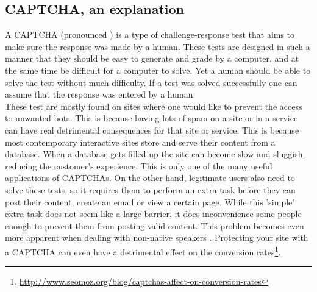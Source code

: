 \documentclass[pdftex,a4paper,12pt,twoside]{report}
\theoremstyle{plain} \newtheorem{theorem}{Theorem} \newtheorem{proposition}{Proposition} \newtheorem{lemma}{Lemma} \newtheorem*{corollary}{Corollary}
\theoremstyle{definition} \newtheorem{definition}{Definition} \newtheorem{conjecture}{Conjecture} \newtheorem*{example}{Example} \newtheorem{algorithm}{Algorithm}
\theoremstyle{remark} \newtheorem*{remark}{Remark} \newtheorem*{note}{Note} \newtheorem{case}{Case}
\begin{document}
\subsection{CAPTCHA, an explanation}
A CAPTCHA (pronounced ) is a type of challenge-response test that aims to make sure the response was made by a human. These tests are designed in such a manner that they should be easy to generate and grade by a computer, and at the same time be difficult for a computer to solve. Yet a human should be able to solve the test without much difficulty. If a test was solved successfully one can assume that the response was entered by a human.\\These test are mostly found on sites where one would like to prevent the access to unwanted bots. This is because having lots of spam on a site or in a service can have real detrimental consequences for that site or service. This is because most contemporary interactive sites store and serve their content from a database. When a database gets filled up the site can become slow and sluggish, reducing the customer's experience. This is only one of the many useful applications of CAPTCHAs. On the other hand, legitimate users also need to solve these tests, so it requires them to perform an extra task before they can post their content, create an email or view a certain page. While this 'simple' extra task does not seem like a large barrier, it does inconvenience some people enough to prevent them from posting valid content. This problem becomes even more apparent when dealing with non-native speakers \citep{Banday2011}. Protecting your site with a CAPTCHA can even have a detrimental effect on the conversion rates\footnote{\url{http://www.seomoz.org/blog/captchas-affect-on-conversion-rates}}.
\end{document}
